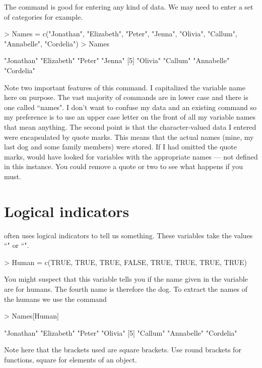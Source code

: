 The  command is good for entering any kind of data. We may need to enter a set of categories for example.
\begin{Schunk}
\begin{Sinput}
> Names = c("Jonathan", "Elizabeth", "Peter", "Jenna", "Olivia", "Callum", "Annabelle", "Cordelia")
> Names
\end{Sinput}
\begin{Soutput}
[1] "Jonathan"  "Elizabeth" "Peter"     "Jenna"    
[5] "Olivia"    "Callum"    "Annabelle" "Cordelia" 
\end{Soutput}
\end{Schunk}
Note two important features of this command. I capitalized the variable name here on purpose. The vast majority of \R{} commands are in lower case and there is one called ``names". I don't want to confuse my data and an existing \R{} command so my preference is to use an upper case letter on the front of all my variable names that mean anything. The second point is that the character-valued data I entered were encapsulated by quote marks. This means that the actual names (mine, my last dog and some family members) were stored. If I had omitted the quote marks, \R{} would have looked for variables with the appropriate names --- not defined in this instance. You could remove a quote or two to see what happens if you must.

\section{Logical indicators}

\R{} often uses logical indicators to tell us something. These variables take the values ``" or ``".

\begin{Schunk}
\begin{Sinput}
> Human = c(TRUE, TRUE, TRUE, FALSE, TRUE, TRUE, TRUE, TRUE)
\end{Sinput}
\end{Schunk}
You might suspect that this variable tells you if the name given in the  variable are for humans. The fourth name is therefore the dog. To extract the names of the humans we use the command
\begin{Schunk}
\begin{Sinput}
> Names[Human]
\end{Sinput}
\begin{Soutput}
[1] "Jonathan"  "Elizabeth" "Peter"     "Olivia"   
[5] "Callum"    "Annabelle" "Cordelia" 
\end{Soutput}
\end{Schunk}
Note here that the brackets used are square brackets. Use round brackets for functions, square for elements of an object.

